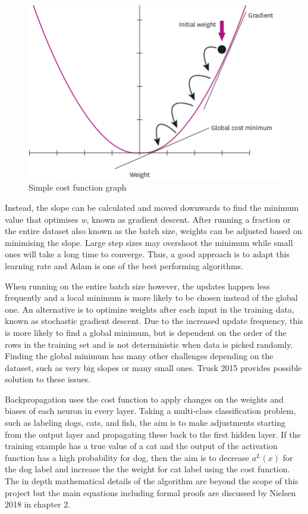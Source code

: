 \documentclass[proposal]{softeng}
\begin{document}
\begin{figure}[h!]
\centering
  \includegraphics[scale=0.2]{images/A-graph-of-a-cost-function-modified-from.png}
  \caption{Simple cost function graph\cite{costfuntion}}
  \label{fig:costfuntiongraph}
\end{figure}

Instead, the slope can be calculated and moved downwards to find the minimum value that optimises \textit{w}, known as gradient descent. After running  a fraction or the entire dataset also known as the batch size, weights can be adjusted based on minimising the slope.  Large step sizes may overshoot the minimum while small ones will take a long time to converge. Thus, a  good approach is to adapt this learning rate and Adam\cite{kingma2014adam} is one of the best performing algorithms.

When running on the entire batch size however, the updates happen less frequently and a local minimum is more likely to be chosen instead of the global one. An alternative is to optimize weights after each input in the training data, known as stochastic gradient descent. Due to the increased update frequency, this is more likely to find a global  minimum, but is dependent on the order of the rows in the training set and is not deterministic when data is picked randomly. Finding the global minimum has many other challenges depending on the dataset, such as very big slopes or many small ones. Trusk 2015 \cite{trask} provides possible solution to these issues.

Backpropagation uses the cost function to apply changes on the weights and biases of each neuron in every layer. Taking a multi-class classification problem, such as labeling dogs, cats, and fish, the aim is to make adjustments starting from the output layer and propagating these back to the first hidden layer. If the training example has a true value of a cat and the output of the activation function has a high probability for dog, then the aim is to decrease \( a^L(x) \) for the dog label and increase the the weight for cat label using the cost function. The in depth mathematical details of the algorithm are beyond the scope of this project but the main equations including formal proofs are discussed by Nielsen 2018 \cite{nielsenneural} in chapter 2.
\end{document}
